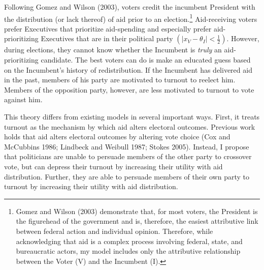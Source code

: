 \documentclass[12pt]{paper}
\begin{document}
Following Gomez and Wilson (2003), voters credit the incumbent President with the distribution (or lack thereof) of aid prior to an election.\footnote{Gomez and Wilson (2003) demonstrate that, for most voters, the President is the figurehead of the government and is, therefore, the easiest attributive link between federal action and individual opinion. Therefore, while acknowledging that aid is a complex process involving federal, state, and bureaucratic actors, my model includes only the attributive relationship between the Voter (V) and the Incumbent (I).} Aid-receiving voters prefer Executives that prioritize aid-spending and especially prefer aid-prioritizing Executives that are in their political party $(|x_V - \theta_I| < \frac{1}{2})$. However, during elections, they cannot know whether the Incumbent is \textit{truly} an aid-prioritizing candidate. The best voters can do is make an educated guess based on the Incumbent's history of redistribution. If the Incumbent has delivered aid in the past, members of his party are motivated to turnout to reelect him. Members of the opposition party, however, are less motivated to turnout to vote against him.

This theory differs from existing models in several important ways. First, it treats turnout as the mechanism by which aid alters electoral outcomes. Previous work holds that aid alters electoral outcomes by altering vote choice (Cox and McCubbins 1986; Lindbeck and Weibull 1987; Stokes 2005). Instead, I propose that politicians are unable to persuade members of the other party to crossover vote, but can depress their turnout by increasing their utility with aid distribution. Further, they are able to persuade members of their own party to turnout by increasing their utility with aid distribution. 
\end{document}
